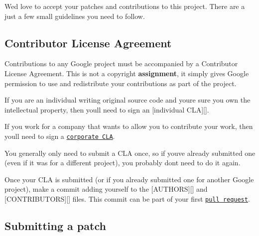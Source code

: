 We\textquotesingle{}d love to accept your patches and contributions to this project. There are a just a few small guidelines you need to follow.

\subsection*{Contributor License Agreement}

Contributions to any Google project must be accompanied by a Contributor License Agreement. This is not a copyright {\bfseries assignment}, it simply gives Google permission to use and redistribute your contributions as part of the project.


\begin{DoxyItemize}
\item If you are an individual writing original source code and you\textquotesingle{}re sure you own the intellectual property, then you\textquotesingle{}ll need to sign an \mbox{[}individual C\+LA\mbox{]}\mbox{[}\mbox{]}.
\item If you work for a company that wants to allow you to contribute your work, then you\textquotesingle{}ll need to sign a \href{https://developers.google.com/open-source/cla/corporate}{\tt corporate C\+LA}.
\end{DoxyItemize}

You generally only need to submit a C\+LA once, so if you\textquotesingle{}ve already submitted one (even if it was for a different project), you probably don\textquotesingle{}t need to do it again.

Once your C\+LA is submitted (or if you already submitted one for another Google project), make a commit adding yourself to the \mbox{[}A\+U\+T\+H\+O\+RS\mbox{]}\mbox{[}\mbox{]} and \mbox{[}C\+O\+N\+T\+R\+I\+B\+U\+T\+O\+RS\mbox{]}\mbox{[}\mbox{]} files. This commit can be part of your first \href{https://help.github.com/articles/creating-a-pull-request}{\tt pull request}.

\subsection*{Submitting a patch}


